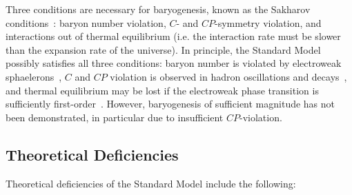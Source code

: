\begin{itemize}
	Three conditions are necessary for baryogenesis, known as the Sakharov conditions~\cite{sakharov}: baryon number violation, $C$- and $CP$-symmetry violation, and interactions out of thermal equilibrium (i.e. the interaction rate must be slower than the expansion rate of the universe). In principle, the Standard Model possibly satisfies all three conditions: baryon number is violated by electroweak sphaelerons~\cite{thooft}, $C$ and $CP$ violation is observed in hadron oscillations and decays~\cite{Kindirect, Kdirect,B,D}, and thermal equilibrium may be lost if the electroweak phase transition is sufficiently first-order~\cite{???}. However, baryogenesis of sufficient magnitude has not been demonstrated, in particular due to insufficient $CP$-violation. 

\end{itemize}

\subsection{Theoretical Deficiencies}\label{sec:bsm-theoretical-deficiencies}
Theoretical deficiencies of the Standard Model include the following:


